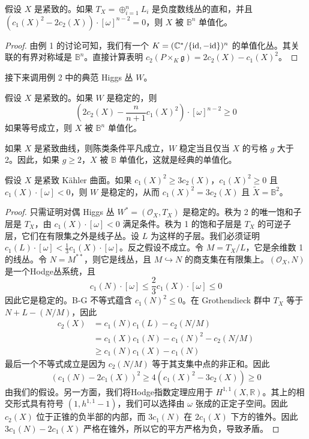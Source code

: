 \begin{corollary}
假设 $X$ 是紧致的。如果 $T_X = \oplus_{i=1}^n L_i$ 是负度数线丛的直和，并且 $(c_1(X)^2 - 2c_2(X)) \cdot [\omega]^{n-2} = 0$，则 $X$ 被 $\mathbb{B}^n$ 单值化。
\end{corollary}

\begin{proof}
由例 1 的讨论可知，我们有一个 $K = (\mathbb{C}^*/\{\mathrm{id}, -\mathrm{id}\})^n$ 的单值化丛。其关联的有界对称域是 $\mathbb{B}^n$。直接计算表明 $c_2(P \times_K \mathfrak{g}) = 2c_2(X) - c_1(X)^2$。
\end{proof}

接下来调用例 2 中的典范 Higgs 丛 $W$。

\begin{proposition}
假设 $X$ 是紧致的。如果 $W$ 是稳定的，则
\[ \left( 2c_2(X) - \frac{n}{n+1} c_1(X)^2 \right) \cdot [\omega]^{n-2} \ge 0 \]
如果等号成立，则 $X$ 被 $\mathbb{B}^n$ 单值化。
\end{proposition}

如果 $X$ 是紧致曲线，则陈类条件平凡成立，$W$ 稳定当且仅当 $X$ 的亏格 $g$ 大于 2。因此，如果 $g \ge 2$，$X$ 被 $\mathbb{B}$ 单值化，这就是经典的单值化。

\begin{proposition}
假设 $X$ 是紧致 Kähler 曲面。如果 $c_1(X)^2 \ge 3c_2(X)$，$c_1(X)^2 \ge 0$ 且 $c_1(X) \cdot [\omega] < 0$，则 $W$ 是稳定的，从而 $c_1(X)^2 = 3c_2(X)$ 且 $\tilde{X} = \mathbb{B}^2$。
\end{proposition}

\begin{proof}
只需证明对偶 Higgs 丛 $W^* = (\mathcal{O}_X, T_X)$ 是稳定的。秩为 2 的唯一饱和子层是 $T_X$，由 $c_1(X) \cdot [\omega] < 0$ 满足条件。秩为 1 的饱和子层是 $T_X$ 的可逆子层，它们在有限集之外是线子丛。设 $L$ 为这样的子层。我们必须证明 $c_1(L) \cdot [\omega] < \frac{1}{3} c_1(X) \cdot [\omega]$。反之假设不成立。令 $M = T_X/L$，它是余维数 1 的线丛。令 $N = M^{**}$，则它是线丛，且 $M \hookrightarrow N$ 的商支集在有限集上。$(\mathcal{O}_X, N)$ 是一个Hodge丛系统，且
\[ c_1(N) \cdot [\omega] \le \frac{2}{3} c_1(X) \cdot [\omega] \le 0 \]
因此它是稳定的。B-G 不等式蕴含 $c_1(N)^2 \le 0$。在 Grothendieck 群中 $T_X$ 等于 $N + L - (N/M)$，因此
\[ \begin{aligned} c_2(X) &= c_1(N)c_1(L) - c_2(N/M) \\ &= c_1(X)c_1(N) - c_1(N)^2 - c_2(N/M) \\ &\ge c_1(N)c_1(X) - c_1(N) \end{aligned} \]
最后一个不等式成立是因为 $c_2(N/M)$ 等于其支集中点的非正和。因此
\[ (c_1(N) - 2c_1(X))^2 \ge 4(c_1(X)^2 - 3c_2(X)) \ge 0 \]
由我们的假设。另一方面，我们将Hodge指数定理应用于 $H^{1,1}(X, \mathbb{R})$。其上的相交形式具有符号 $(1, h^{1,1}-1)$，我们可以选择由 $\omega$ 张成的正定子空间。因此 $c_2(X)$ 位于正锥的负半部的内部，而 $3c_1(N)$ 在 $2c_1(X)$ 下方的锥外。因此 $3c_1(N) - 2c_1(X)$ 严格在锥外，所以它的平方严格为负，导致矛盾。
\end{proof}
